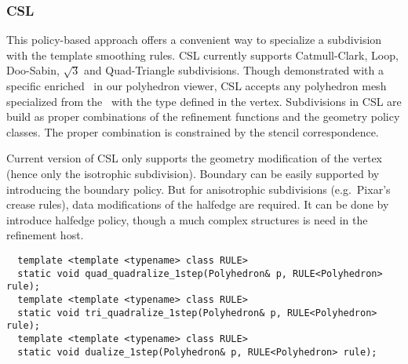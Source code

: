 \subsubsection{CSL}
This policy-based approach offers a convenient way to
specialize a subdivision with the template smoothing rules.
CSL currently supports Catmull-Clark, 
Loop, Doo-Sabin, $\sqrt{3}$ and Quad-Triangle
subdivisions. %
Though demonstrated with a specific enriched \poly\ in our 
polyhedron viewer, CSL accepts any polyhedron mesh specialized 
from the \poly\ with the  type defined in the vertex.  
Subdivisions in CSL are build as proper combinations of the
refinement functions and the geometry policy classes.
The proper combination is constrained by the stencil correspondence.

Current version of CSL only supports the geometry modification 
of the vertex (hence only the isotrophic subdivision). Boundary
can be easily supported by introducing the boundary policy. But
for anisotrophic subdivisions (e.g.\ Pixar's crease rules), data
modifications of the halfedge are required. It can be done by 
introduce halfedge policy, though a much complex structures
is need in the refinement host.


\begin{lstlisting}
  template <template <typename> class RULE>
  static void quad_quadralize_1step(Polyhedron& p, RULE<Polyhedron> rule);
  template <template <typename> class RULE>
  static void tri_quadralize_1step(Polyhedron& p, RULE<Polyhedron> rule);
  template <template <typename> class RULE>
  static void dualize_1step(Polyhedron& p, RULE<Polyhedron> rule);
\end{lstlisting}



